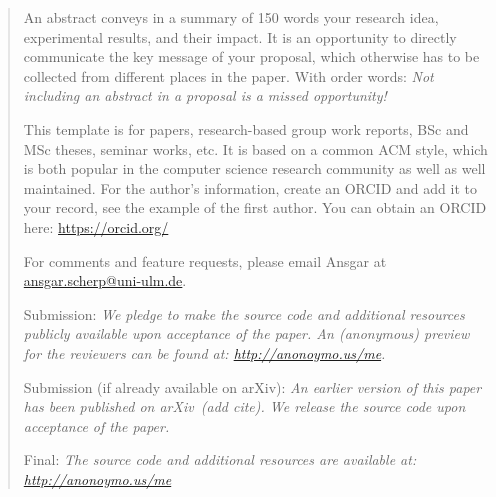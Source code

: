 \documentclass[sigconf, nonacm]{acmart}
\begin{document}
\author{Julius P. Kumquat}

\renewcommand{\shortauthors}{Trovato and Tobin, et al.}

\begin{abstract}

\begin{tcolorbox}[title=Abstract: How to write it]
An abstract conveys in a summary of 150 words your research idea, experimental results, and their impact. It is an opportunity to directly communicate the key message of your proposal, which otherwise has to be collected from different places in the paper. With order words: \textit{Not including an abstract in a proposal is a missed opportunity!}
\end{tcolorbox}

This template is for papers, research-based group work reports, BSc and MSc theses, seminar works, etc. 
It is based on a common ACM style, which is both popular in the computer science research community as well as well maintained.
%
For the author's information, create an ORCID and add it to your record, see the example of the first author.
You can obtain an ORCID here: \url{https://orcid.org/}


For comments and feature requests, please email Ansgar at
\href{mailto:ansgar.scherp@uni-ulm.de?subject=DSBDA-TemplateForPaper-Annotated}{ansgar.scherp@uni-ulm.de}.


Submission: \textit{We pledge to make the source code and additional resources publicly available upon acceptance of the paper.
An (anonymous) preview for the reviewers can be found at:
\url{http://anonoymo.us/me}.}

Submission (if already available on arXiv): \textit{An earlier version of this paper has been published on arXiv~(add cite). %
We release the source code upon acceptance of the paper.}

Final: \textit{The source code and additional resources are available at: \url{http://anonoymo.us/me}}


\end{abstract}
\end{document}

